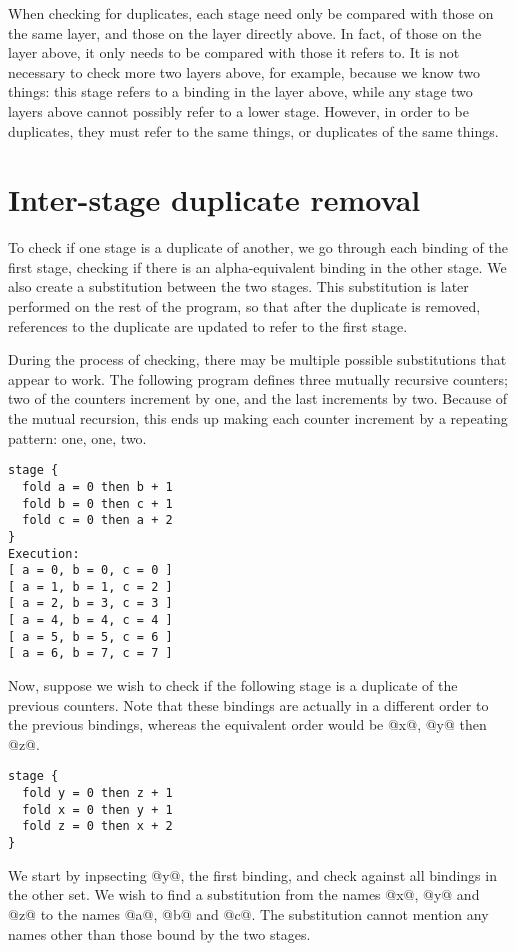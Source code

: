 When checking for duplicates, each stage need only be compared with those on the same layer, and those on the layer directly above.
In fact, of those on the layer above, it only needs to be compared with those it refers to.
It is not necessary to check more two layers above, for example, because we know two things:
this stage refers to a binding in the layer above, while any stage two layers above cannot possibly refer to a lower stage.
However, in order to be duplicates, they must refer to the same things, or duplicates of the same things.


\section{Inter-stage duplicate removal}
To check if one stage is a duplicate of another, we go through each binding of the first stage, checking if there is an alpha-equivalent binding in the other stage.
We also create a substitution between the two stages.
This substitution is later performed on the rest of the program, so that after the duplicate is removed, references to the duplicate are updated to refer to the first stage.

During the process of checking, there may be multiple possible substitutions that appear to work.
The following program defines three mutually recursive counters; two of the counters increment by one, and the last increments by two.
Because of the mutual recursion, this ends up making each counter increment by a repeating pattern: one, one, two.
\begin{lstlisting}
stage {
  fold a = 0 then b + 1
  fold b = 0 then c + 1
  fold c = 0 then a + 2
}
Execution:
[ a = 0, b = 0, c = 0 ]
[ a = 1, b = 1, c = 2 ]
[ a = 2, b = 3, c = 3 ]
[ a = 4, b = 4, c = 4 ]
[ a = 5, b = 5, c = 6 ]
[ a = 6, b = 7, c = 7 ]
\end{lstlisting}

Now, suppose we wish to check if the following stage is a duplicate of the previous counters.
Note that these bindings are actually in a different order to the previous bindings, whereas the equivalent order would be @x@, @y@ then @z@.
\begin{lstlisting}
stage {
  fold y = 0 then z + 1
  fold x = 0 then y + 1
  fold z = 0 then x + 2
}
\end{lstlisting}

We start by inpsecting @y@, the first binding, and check against all bindings in the other set.
We wish to find a substitution from the names @x@, @y@ and @z@ to the names @a@, @b@ and @c@.
The substitution cannot mention any names other than those bound by the two stages.

